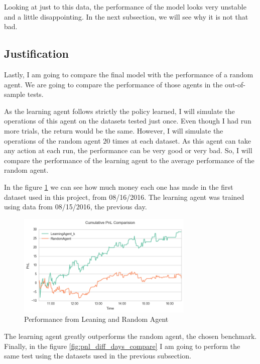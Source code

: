 \documentclass[a4paper]{article}
\begin{document}
Looking at just to this data, the performance of the model looks very unstable and a little disappointing. In the next subsection, we will see why it is not that bad.


\subsection{Justification}
Lastly, I am going to compare the final model with the performance of a random agent. We are going to compare the performance of those agents in the out-of-sample tests.

As the learning agent follows strictly the policy learned, I will simulate the operations of this agent on the datasets tested just once. Even though I had run more trials, the return would be the same. However, I will simulate the operations of the random agent $20$ times at each dataset. As this agent can take any action at each run, the performance can be very good or very bad. So, I will compare the performance of the learning agent to the average performance of the random agent.

In the figure \ref{fig:optimal_vs_random_pnl} we can see how much money each one has made in the first dataset used in this project, from 08/16/2016. The learning agent was trained using data from 08/15/2016, the previous day.

\begin{figure}[ht]
\centering
\includegraphics[width=0.75\textwidth]{figures/optimal_vs_random_pnl.png}
\caption{\label{fig:optimal_vs_random_pnl}Performance from Leaning and Random Agent}
\end{figure}

The learning agent greatly outperforms the random agent, the chosen benchmark. Finally, in the figure \ref{fig:pnl_diff_days_compare} I am going to perform the same test using the datasets used in the previous subsection.
\end{document}
